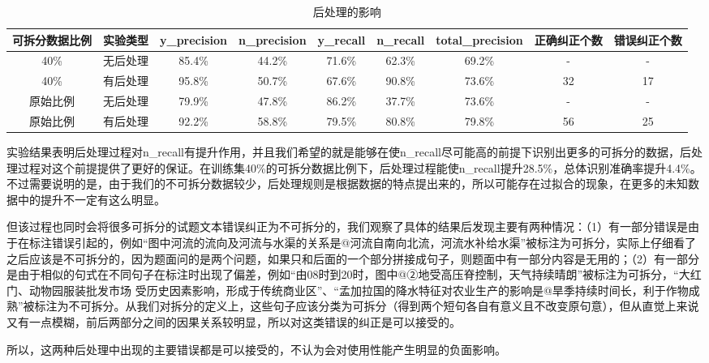 \documentclass[master, winfont]{njuthesis}
\begin{document}
\begin{table}
\begin{center}
\begin{tabular}{c|c|c|c|c|c|c|c|c}
\hline {可拆分数据比例} & {实验类型} & {y\_precision} & {n\_precision} & {y\_recall} & {n\_recall} & {total\_precision} & {正确纠正个数} & {错误纠正个数}  \\
\hline 40\% & 无后处理 & 85.4\% & 44.2\% & 71.6\% & 62.3\% & 69.2\% & - & - \\
\hline 40\% & 有后处理 & 95.8\% & 50.7\% & 67.6\% & 90.8\% & 73.6\% & 32 & 17\\
\hline 原始比例 & 无后处理 & 79.9\% & 47.8\% & 86.2\% & 37.7\% & 73.6\% & - & -\\
\hline 原始比例 & 有后处理 & 92.2\% & 58.8\% & 79.5\% & 80.8\% & 79.8\% & 56 & 25\\

\hline
\end{tabular}
\end{center}
\caption{\label{table:postprocess} 后处理的影响}
\end{table}

实验结果表明后处理过程对n\_recall有提升作用，并且我们希望的就是能够在使n\_recall尽可能高的前提下识别出更多的可拆分的数据，后处理过程对这个前提提供了更好的保证。在训练集40\%的可拆分数据比例下，后处理过程能使n\_recall提升28.5\%，总体识别准确率提升4.4\%。不过需要说明的是，由于我们的不可拆分数据较少，后处理规则是根据数据的特点提出来的，所以可能存在过拟合的现象，在更多的未知数据中的提升不一定有这么明显。

但该过程也同时会将很多可拆分的试题文本错误纠正为不可拆分的，我们观察了具体的结果后发现主要有两种情况：（1）有一部分错误是由于在标注错误引起的，例如“图中河流的流向及河流与水渠的关系是@河流自南向北流，河流水补给水渠”被标注为可拆分，实际上仔细看了之后应该是不可拆分的，因为题面问的是两个问题，如果只和后面的一个部分拼接成句子，则题面中有一部分内容是无用的；（2）有一部分是由于相似的句式在不同句子在标注时出现了偏差，例如“由08时到20时，图中@②地受高压脊控制，天气持续晴朗”被标注为可拆分，“大红门、动物园服装批发市场	受历史因素影响，形成于传统商业区”、“孟加拉国的降水特征对农业生产的影响是@旱季持续时间长，利于作物成熟”被标注为不可拆分。从我们对拆分的定义上，这些句子应该分类为可拆分（得到两个短句各自有意义且不改变原句意），但从直觉上来说又有一点模糊，前后两部分之间的因果关系较明显，所以对这类错误的纠正是可以接受的。

所以，这两种后处理中出现的主要错误都是可以接受的，不认为会对使用性能产生明显的负面影响。
\end{document}
